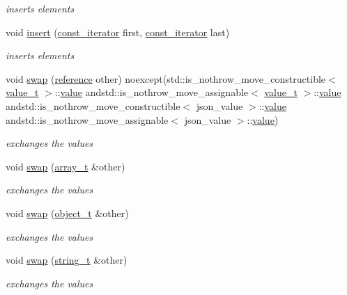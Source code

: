 \begin{DoxyCompactItemize}
\begin{DoxyCompactList}\small\item\em inserts elements \end{DoxyCompactList}\item 
void \hyperlink{classnlohmann_1_1basic__json_a1b0a4e60d56f1fe80501ed941e122892}{insert} (\hyperlink{classnlohmann_1_1basic__json_a41a70cf9993951836d129bb1c2b3126a}{const\+\_\+iterator} first, \hyperlink{classnlohmann_1_1basic__json_a41a70cf9993951836d129bb1c2b3126a}{const\+\_\+iterator} last)
\begin{DoxyCompactList}\small\item\em inserts elements \end{DoxyCompactList}\item 
void \hyperlink{classnlohmann_1_1basic__json_a66d4de311f79f2fe640793ab7a178781}{swap} (\hyperlink{classnlohmann_1_1basic__json_ac6a5eddd156c776ac75ff54cfe54a5bc}{reference} other) noexcept(std\+::is\+\_\+nothrow\+\_\+move\+\_\+constructible$<$ \hyperlink{namespacenlohmann_1_1detail_a90aa5ef615aa8305e9ea20d8a947980f}{value\+\_\+t} $>$\+::\hyperlink{classnlohmann_1_1basic__json_a9fa223b26419f018f9b18cc516e3a8e5}{value} andstd\+::is\+\_\+nothrow\+\_\+move\+\_\+assignable$<$ \hyperlink{namespacenlohmann_1_1detail_a90aa5ef615aa8305e9ea20d8a947980f}{value\+\_\+t} $>$\+::\hyperlink{classnlohmann_1_1basic__json_a9fa223b26419f018f9b18cc516e3a8e5}{value} andstd\+::is\+\_\+nothrow\+\_\+move\+\_\+constructible$<$ json\+\_\+value $>$\+::\hyperlink{classnlohmann_1_1basic__json_a9fa223b26419f018f9b18cc516e3a8e5}{value} andstd\+::is\+\_\+nothrow\+\_\+move\+\_\+assignable$<$ json\+\_\+value $>$\+::\hyperlink{classnlohmann_1_1basic__json_a9fa223b26419f018f9b18cc516e3a8e5}{value})
\begin{DoxyCompactList}\small\item\em exchanges the values \end{DoxyCompactList}\item 
void \hyperlink{classnlohmann_1_1basic__json_a65b0a24e1361a030ad0a661de22f6c8e}{swap} (\hyperlink{classnlohmann_1_1basic__json_a4c409f1b6d9caf3412c78af9a5883fed}{array\+\_\+t} \&other)
\begin{DoxyCompactList}\small\item\em exchanges the values \end{DoxyCompactList}\item 
void \hyperlink{classnlohmann_1_1basic__json_ac31f12587d2f1a3be5ffc394aa9d72a4}{swap} (\hyperlink{classnlohmann_1_1basic__json_a3cdea044cc3ecba1c4f9874a89daf6e4}{object\+\_\+t} \&other)
\begin{DoxyCompactList}\small\item\em exchanges the values \end{DoxyCompactList}\item 
void \hyperlink{classnlohmann_1_1basic__json_adaa1ed0a889d86c8e0216a3d66980f76}{swap} (\hyperlink{classnlohmann_1_1basic__json_a61f8566a1a85a424c7266fb531dca005}{string\+\_\+t} \&other)
\begin{DoxyCompactList}\small\item\em exchanges the values \end{DoxyCompactList}\end{DoxyCompactItemize}
